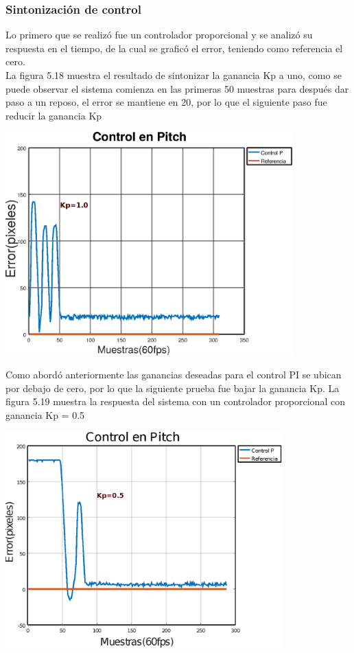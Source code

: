 \subsubsection{Sintonización de control}
Lo primero que se realizó fue un controlador proporcional y se analizó su respuesta en el tiempo, de la cual se graficó el error, teniendo
como referencia el cero.\\
La figura 5.18 muestra el resultado de sintonizar la ganancia Kp a uno, como se puede observar el sistema comienza en las primeras 50 muestras
para después dar paso a un reposo, el error se mantiene en 20, por lo que el siguiente paso fue reducir la ganancia Kp
\begin{center}
	\includegraphics[width=0.83\textwidth]{Contenido/Cuerpo/Capitulo5/Fig25.eps}
	\label{Fig4}
\end{center}
Como abordó anteriormente las ganancias deseadas para el control PI se ubican por debajo de cero, por lo que la siguiente prueba fue bajar la ganancia Kp.
La figura 5.19 muestra la respuesta del sistema con un controlador proporcional con ganancia Kp = 0.5
\begin{center}
	\includegraphics[width=0.8\textwidth]{Contenido/Cuerpo/Capitulo5/Fig26.eps}
	\label{Fig4}
\end{center}
